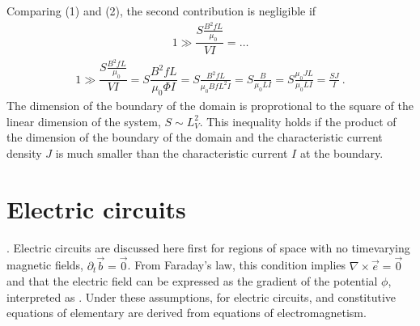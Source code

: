 \documentclass[letterpaper,10pt,english]{jupyterBook}
\begin{document}
\sphinxAtStartPar
Comparing (1) and (2), the second contribution is negligible if
\begin{equation*}
\begin{split}1 \gg \dfrac{S \frac{B^2 f L}{\mu_0}}{VI} = \dots\end{split}
\end{equation*}
\sphinxAtStartPar
{} 
\begin{equation*}
\begin{split}1 \gg \dfrac{S \frac{B^2 f L}{\mu_0}}{VI} = S \dfrac{B^2 f L}{\mu_0 \Phi I} = S \frac{B^2 f L}{\mu_0 B f L^2 I} = S \frac{B}{\mu_0 L I} = S \frac{\mu_0 J L}{\mu_0 L I} = \frac{S J}{I} \ .\end{split}
\end{equation*}
\sphinxAtStartPar
The dimension of the boundary of the domain is proprotional to the square of the linear dimension of the system, \(S \sim L_{V}^2\). This inequality holds if the product of the dimension of the boundary of the domain and the characteristic current density \(J\) is much smaller than the characteristic current \(I\) at the boundary.



\sphinxstepscope




\chapter{Electric circuits}
\label{\detokenize{ch/circuits-electric:electric-circuits}}\label{\detokenize{ch/circuits-electric:classical-electromagnetism-circuits-electric}}\label{\detokenize{ch/circuits-electric::doc}}
\sphinxAtStartPar
{\hyperref[\detokenize{ch/circuits-electric-components:classical-electromagnetism-circuits-electric-approx}]{}}. Electric circuits are discussed here first for regions of space with no time\sphinxhyphen{}varying magnetic fields, \(\partial_t \vec{b} = \vec{0}\). From Faraday’s law, this condition implies \(\nabla \times \vec{e} = \vec{0}\) and that the electric field can be expressed as the gradient of the potential \(\phi\), interpreted as . Under these assumptions, {\hyperref[\detokenize{ch/circuits-electric-components:physics-hs-electromagnetism-circuits-electric-kirchhoff-laws}]{}} for electric circuits, and constitutive equations of elementary {\hyperref[\detokenize{ch/circuits-electric-components:classical-electromagnetism-circuits-electric-components}]{}} are derived from equations of electromagnetism.
\end{document}
